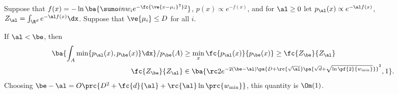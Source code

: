 \begin{lem}\label{lem:delta}
Suppose that $f(x) = -\ln \ba{\sumo in  w_i e^{-\fc{\ve{x-\mu_i}^2}2}}$, $p(x)\propto e^{-f(x)}$, and for $\al\ge 0$ let $p_\al(x) \propto e^{-\al f(x)}$, $Z_\al =\int_{\R^d} e^{-\al f(x)}\dx$. 
Suppose that $\ve{\mu_i}\le D$ for all $i$. 

If $\al<\be$, then
\begin{align}
\ba{
\int_{A} \min\{p_{\al}(x),p_\be(x)\} \dx 
}/p_\be(A)
&\ge
\min_x\fc{p_\al(x)}{p_\be(x)} \ge \fc{Z_\be}{Z_\al}\\
\fc{Z_\be}{Z_\al}&
\in \ba{
\rc2 e^{-2(\be-\al)\pa{D+\rc{\sqrt\al}\pa{\sqrt d + \sqrt{\ln \pf{2}{w_{\min}}}}}^2}, 1}.
\end{align}
Choosing $\be-\al=O\prc{D^2+\fc{d}{\al}+\rc{\al}\ln\prc{w_{\min}}}$, this quantity is $\Om(1)$.
\end{lem}
